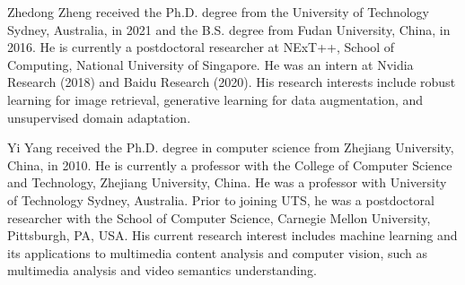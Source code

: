 \documentclass[journal]{IEEEtran}
\begin{document}
\begin{IEEEbiography}{Zhedong Zheng} received the Ph.D. degree from the University of Technology Sydney, Australia, in 2021 and the B.S. degree from Fudan University, China, in 2016. He is currently a postdoctoral researcher at NExT++, School of Computing, National University of Singapore. He was an intern at Nvidia Research (2018) and Baidu Research (2020). His research interests include robust learning for image retrieval, generative learning for data augmentation, and unsupervised domain adaptation.
\end{IEEEbiography}
\vfill
\begin{IEEEbiography}{Yi Yang} received the Ph.D. degree in computer
science from Zhejiang University, China, in 2010. He is currently a professor with the College of
Computer Science and Technology, Zhejiang University, China. He was a professor with University of Technology Sydney, Australia. Prior to joining UTS, he was a postdoctoral researcher with the School of Computer Science, Carnegie Mellon University, Pittsburgh, PA, USA. His current research interest includes machine learning and its applications to multimedia content analysis and computer vision, such as multimedia analysis and video semantics understanding.
\end{IEEEbiography}
\end{document}
